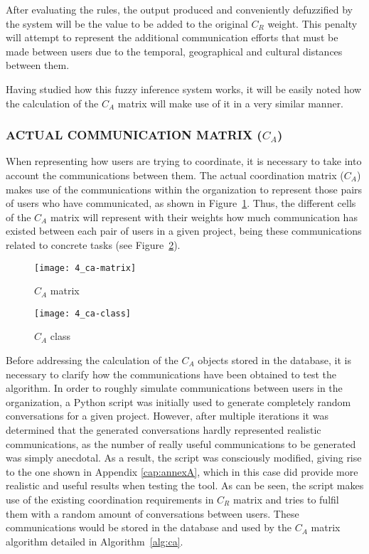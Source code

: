 \begin{itemize}
	After evaluating the rules, the output produced and conveniently defuzzified by the system will be the value to be added to the original $C_R$ weight. This penalty will attempt to represent the additional communication efforts that must be made between users due to the temporal, geographical and cultural distances between them.\newline
	
	Having studied how this fuzzy inference system works, it will be easily noted how the calculation of the $C_A$ matrix will make use of it in a very similar manner.

\end{itemize}

\subsubsection{ACTUAL COMMUNICATION MATRIX ($C_A$)}

When representing how users are trying to coordinate, it is necessary to take into account the communications between them. The actual coordination matrix ($C_A$) makes use of the communications within the organization to represent those pairs of users who have communicated, as shown in Figure~\ref{fig:ca-matrix}. Thus, the different cells of the $C_A$ matrix will represent with their weights how much communication has existed between each pair of users in a given project, being these communications related to concrete tasks (see Figure~\ref{fig:ca-class}).

\begin{figure}
	\centering
	\texttt{[image: 4\_ca-matrix]}
	\caption[$C_A$ matrix]{$C_A$ matrix}
	\label{fig:ca-matrix}
\end{figure}

\begin{figure}
	\centering
	\texttt{[image: 4\_ca-class]}
	\caption[$C_A$ class]{$C_A$ class}
	\label{fig:ca-class}
\end{figure}

Before addressing the calculation of the $C_A$ objects stored in the database, it is necessary to clarify how the communications have been obtained to test the algorithm. In order to roughly simulate communications between users in the organization, a Python script was initially used to generate completely random conversations for a given project. However, after multiple iterations it was determined that the generated conversations hardly represented realistic communications, as the number of really useful communications to be generated was simply anecdotal. As a result, the script was consciously modified, giving rise to the one shown in Appendix \ref{cap:annexA}, which in this case did provide more realistic and useful results when testing the tool. As can be seen, the script makes use of the existing coordination requirements in $C_R$ matrix and tries to fulfil them with a random amount of conversations between users. These communications would be stored in the database and used by the $C_A$ matrix algorithm detailed in Algorithm~\ref{alg:ca}.

